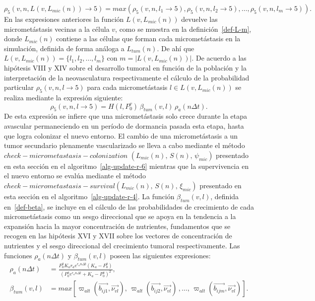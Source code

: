 \begin{equation*}
\rho_5(v,n,L(v,L_{mic}(n)) \rightarrow 5) = max(\rho_5(v,n,l_1 \rightarrow 5),\rho_5(v,n,l_2 \rightarrow 5),\ldots,\rho_5(v,n,l_m \rightarrow 5)).
\end{equation*}
En las expresiones anteriores la funci\'on $L(v,L_{mic}(n))$ devuelve las micromet\'astasis vecinas a la c\'elula $v$, como se muestra en la definici\'on~\ref{def-L-m}, donde $L_{mic}(n)$ contiene a las c\'elulas que forman cada micromet\'astasis en la simulaci\'on, definida de forma an\'aloga a $L_{tum}(n)$. De ah\'i que $L(v,L_{mic}(n))=\lbrace l_1, l_2, \ldots, l_m \rbrace$ con $m=|L(v,L_{mic}(n))|$. De acuerdo a las hip\'otesis VIII y XIV sobre el desarrollo tumoral en funci\'on de la poblaci\'on y la interpretaci\'on de la neovasculatura respectivamente el c\'alculo de la probabilidad particular $\rho_5(v,n,l \rightarrow 5)$ para cada micromet\'astasis $l \in L(v,L_{mic}(n))$ se realiza mediante la expresi\'on siguiente:
\begin{equation*}
\rho_5(v,n,l \rightarrow 5) = H(l,P_0^v)\,\beta_{tum}(v,l)\,\rho_a(n\Delta t). 
\end{equation*}
De esta expresi\'on se infiere que una micromet\'astasis solo crece durante la etapa avascular permaneciendo en un per\'iodo de dormancia pasada esta etapa, hasta que logra colonizar el nuevo entorno. El cambio de una micromet\'astasis a un tumor secundario plenamente vascularizado se lleva a cabo mediante el m\'etodo $check-micrometastasis-colonization$ $(L_{mic}(n),\,S(n),\,\psi_{mic})$ presentado en esta secci\'on en el algoritmo~\ref{alg-update-r-6} mientras que la supervivencia en el nuevo entorno se eval\'ua mediante el m\'etodo $check-micrometastasis-survival(L_{mic}(n),\,S(n),\,\xi_{mic})$ presentado en esta secci\'on en el algoritmo~\ref{alg-update-r-4}. La funci\'on $\beta_{tum}(v,l)$, definida en~\ref{def-beta}, se incluye en el c\'alculo de las probabilidades de crecimiento de cada micromet\'astasis como un sesgo direccional que se apoya en la tendencia a la expansi\'on hacia la mayor concentraci\'on de nutrientes, fundamentos que se recogen en las hip\'otesis XVI y XVII sobre los vectores de concentraci\'on de nutrientes y el sesgo direccional del crecimiento tumoral respectivamente. Las funciones $\rho_a(n\Delta t)$ y $\beta_{tum}(v,l)$ poseen las siguientes expresiones:
\begin{align*}
\rho_a(n\Delta t)& = \displaystyle\frac{P_0^a K_a r_a e^{r_a n\Delta t}(K_a-P_0^a)}{(P_0^a e^{r_a n\Delta t} + K_a - P_0^a)^2}, \\
\beta_{tum}(v,l)& = max\left[\varpi_{alt}(\overrightarrow{b_{ij1}},\overrightarrow{\nu_{vl}}),\,\varpi_{alt}(\overrightarrow{b_{ij2}}, \overrightarrow{\nu_{vl}})\,,\ldots,\,\varpi_{alt}(\overrightarrow{b_{ijm}}, \overrightarrow{\nu_{vl}})\right].
\end{align*}
